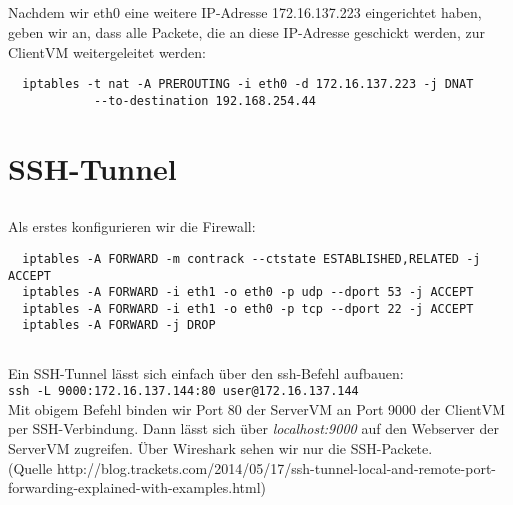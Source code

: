 \documentclass{scrartcl}
\begin{document}
\begin{enumerate}[\bfseries 1.]
	\subsection{}
	\label{sub:3.6}
	Nachdem wir eth0 eine weitere IP-Adresse 172.16.137.223 eingerichtet haben,
	geben wir an, dass alle Packete, die an diese IP-Adresse geschickt werden,
	zur ClientVM weitergeleitet werden:
	\begin{lstlisting}
  iptables -t nat -A PREROUTING -i eth0 -d 172.16.137.223 -j DNAT
            --to-destination 192.168.254.44
	\end{lstlisting}

	\section{SSH-Tunnel}
	\label{sec:SSH-Tunnel}
	\subsection{}
	\label{sub:4.1}
	Als erstes konfigurieren wir die Firewall:
	\begin{lstlisting}
  iptables -A FORWARD -m contrack --ctstate ESTABLISHED,RELATED -j ACCEPT
  iptables -A FORWARD -i eth1 -o eth0 -p udp --dport 53 -j ACCEPT
  iptables -A FORWARD -i eth1 -o eth0 -p tcp --dport 22 -j ACCEPT
  iptables -A FORWARD -j DROP
	\end{lstlisting}

	\subsection{}
	\label{sub:4.2}
	Ein SSH-Tunnel lässt sich einfach über den ssh-Befehl aufbauen: \\
	\texttt{ssh -L 9000:172.16.137.144:80 user@172.16.137.144}\\
	Mit obigem Befehl binden wir Port 80 der ServerVM an Port 9000 der ClientVM
	per SSH-Verbindung. Dann lässt sich über \textit{localhost:9000} auf den
	Webserver der ServerVM zugreifen. Über Wireshark sehen wir nur die
	SSH-Packete.\\
	(Quelle http://blog.trackets.com/2014/05/17/ssh-tunnel-local-and-remote-port-forwarding-explained-with-examples.html)


\end{enumerate}
\end{document}
